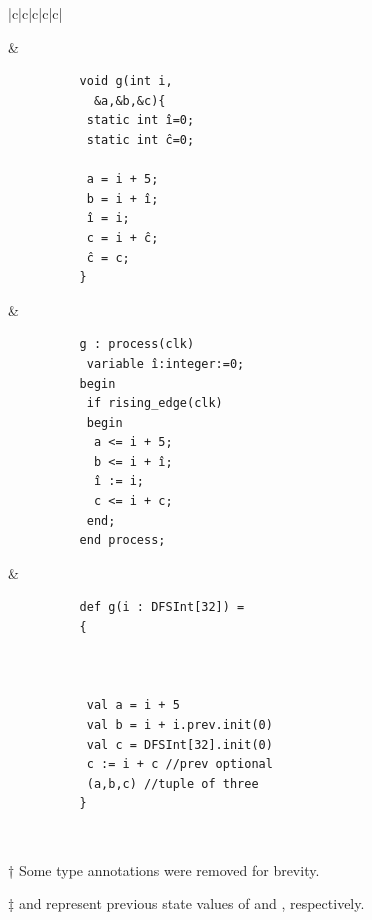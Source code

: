 \begin{table}
\begin{threeparttable}
\begin{tabular}{|c|c|c|c|c|}
\begin{minipage}[b][3.1cm][c]{0.18\linewidth}
			\end{minipage}%
			&
			\begin{minipage}[b]{0.15\linewidth}
				\begin{verbatim}
          void g(int i,
            &a,&b,&c){
           static int î=0;
           static int ĉ=0;
            
           a = i + 5;
           b = i + î;
           î = i;
           c = i + ĉ;
           ĉ = c;
          }
				\end{verbatim}
			\end{minipage}
			&
			\begin{minipage}[b]{0.21\linewidth}
				\begin{verbatim}
          g : process(clk)
           variable î:integer:=0;
          begin
           if rising_edge(clk)
           begin
            a <= i + 5;
            b <= i + î;
            î := i;
            c <= i + c;
           end; 
          end process;
				\end{verbatim}
			\end{minipage}
			&
			\begin{minipage}[b]{0.24\linewidth}
				\begin{verbatim}
          def g(i : DFSInt[32]) = 
          {
            
            
            
           val a = i + 5
           val b = i + i.prev.init(0)
           val c = DFSInt[32].init(0)
           c := i + c //prev optional
           (a,b,c) //tuple of three
          }
				\end{verbatim}
			\end{minipage}
			\\
			\hline
		\end{tabular}
		\begin{tablenotes}
			\item [†] Some type annotations were removed for brevity.
			\item [‡]  and  represent previous state values of  and , respectively.
		\end{tablenotes}
	\end{threeparttable}
\end{table}%


